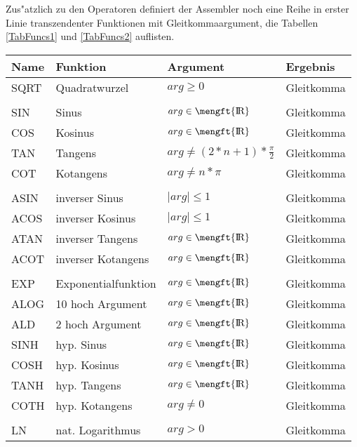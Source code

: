 \documentclass[12pt,a4paper,twoside]{report}
\def \rz{\hbox{\mengft{I \hskip -1.7mm R}}}
\begin{document}
Zus"atzlich zu den Operatoren definiert der Assembler noch eine Reihe
in erster Linie transzendenter Funktionen mit Gleitkommaargument, die
Tabellen \ref{TabFuncs1} und \ref{TabFuncs2} auflisten.
\begin{table*}[htbp]
\begin{center}\begin{tabular}{|l|l|l|l|}
\hline
Name     & Funktion             & Argument & Ergebnis \\
\hline
\hline
SQRT     & Quadratwurzel        & $arg \geq 0$ & Gleitkomma \\
         &                      & & \\
SIN      & Sinus                & $arg \in \rz$ & Gleitkomma \\
COS      & Kosinus              & $arg \in \rz$ & Gleitkomma \\
TAN      & Tangens              & $arg \neq (2*n+1)*\frac{\pi}{2}$ & Gleitkomma \\
COT      & Kotangens            & $arg \neq n*\pi$ & Gleitkomma \\
         &                      & & \\
ASIN     & inverser Sinus       & $\mid arg \mid \leq 1$ & Gleitkomma \\
ACOS     & inverser Kosinus     & $\mid arg \mid \leq 1$ & Gleitkomma \\
ATAN     & inverser Tangens     & $arg \in \rz$ & Gleitkomma \\
ACOT     & inverser Kotangens   & $arg \in \rz$ & Gleitkomma \\
         &                      & & \\
EXP      & Exponentialfunktion  & $arg \in \rz$ & Gleitkomma \\
ALOG     & 10 hoch Argument     & $arg \in \rz$ & Gleitkomma \\
ALD      & 2 hoch Argument      & $arg \in \rz$ & Gleitkomma \\
SINH     & hyp. Sinus           & $arg \in \rz$ & Gleitkomma \\
COSH     & hyp. Kosinus         & $arg \in \rz$ & Gleitkomma \\
TANH     & hyp. Tangens         & $arg \in \rz$ & Gleitkomma \\
COTH     & hyp. Kotangens       & $arg \neq 0$ & Gleitkomma \\
         &                      & & \\
LN       & nat. Logarithmus     & $arg > 0$ & Gleitkomma \\

\end{tabular}
\end{center}
\end{table*}
\end{document}

